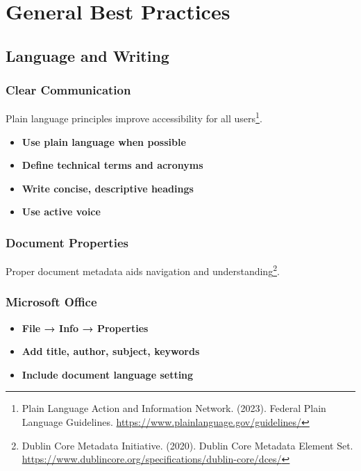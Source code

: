 \section{General Best Practices}
\label{sec:general-best-practices}

\subsection{Language and Writing}

\subsubsection{Clear Communication}
Plain language principles improve accessibility for all users\footnote{Plain Language Action and Information Network. (2023). Federal Plain Language Guidelines. \url{https://www.plainlanguage.gov/guidelines/}}.

\begin{itemize}
\item \textbf{Use plain language when possible}
\item \textbf{Define technical terms and acronyms}
\item \textbf{Write concise, descriptive headings}
\item \textbf{Use active voice}
\end{itemize}

\subsubsection{Document Properties}
Proper document metadata aids navigation and understanding\footnote{Dublin Core Metadata Initiative. (2020). Dublin Core Metadata Element Set. \url{https://www.dublincore.org/specifications/dublin-core/dces/}}.

\subsubsection{Microsoft Office}
\vspace{1em}
\begin{itemize}
\item \textbf{File → Info → Properties}
\item \textbf{Add title, author, subject, keywords}
\item \textbf{Include document language setting}
\end{itemize}
\vspace{1em}


